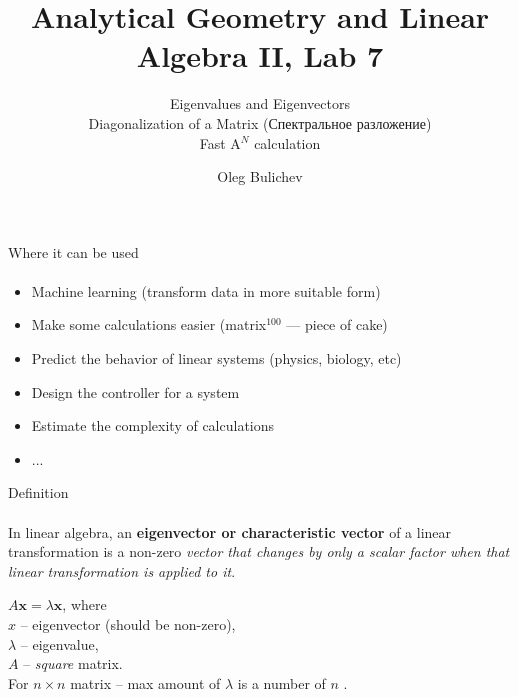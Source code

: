 \documentclass[aspectratio=169]{beamer}
\title[AGLA2]{Analytical Geometry and Linear Algebra II, Lab 7} %
\subtitle{Eigenvalues and Eigenvectors \\ Diagonalization of a Matrix (Спектральное разложение) \\ Fast A$^N$ calculation
         } %
\author{Oleg Bulichev}
\newcommand{\fbckg}[1]{\usebackgroundtemplate{\texttt{[image: \#1]}}}%
\begin{document}
\setlength{\abovedisplayskip}{0pt}
\setlength{\belowdisplayskip}{0pt}
\setlength{\abovedisplayshortskip}{0pt}
\setlength{\belowdisplayshortskip}{0pt}

\fbckg{fibeamer/figs/title_page.png}

\fbckg{fibeamer/figs/common.png}


\begin{frame}[t]{Where it can be used}
\framesubtitle{}
\Large
    \begin{itemize}
        \item Machine learning (transform data in more suitable form)
        \item Make some calculations easier (matrix$^{100}$ --- piece of cake)
        \item Predict the behavior of linear systems (physics, biology, etc)
        \item Design the controller for a system
        \item Estimate the complexity of calculations
        \item ...
    \end{itemize}
\end{frame}

\begin{frame}[t]{Definition}
\framesubtitle{}
\Large 
In linear algebra, an \textbf{eigenvector or characteristic vector }of a linear transformation is a non-zero \textit{vector that changes by only a scalar factor when that linear transformation is applied to it}. 
\bigskip

$ A\mathbf{x}=\lambda\mathbf{x}$, where \\ 
$x$ -- eigenvector (should be non-zero), \\ 
$\lambda$ -- eigenvalue, \\ 
$A$ -- \textit{square} matrix. \\ 
For $n \times n$ matrix -- max amount of $\lambda$ is a number of $n$ .
\end{frame}
\end{document}
